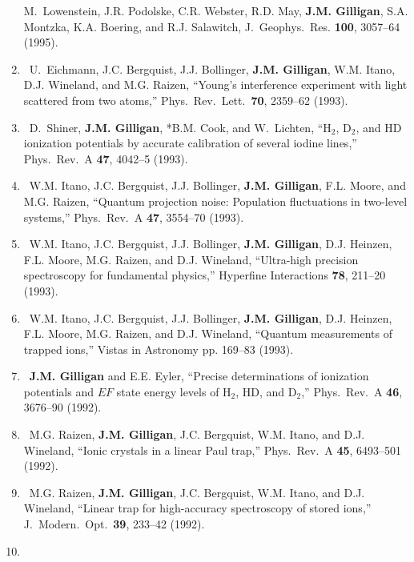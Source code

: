 \begin{enumerate}
    M.~Lowenstein, J.R. Podolske, C.R. Webster, R.D. May, \textbf{J.M. Gilligan}, S.A. Montzka, K.A. Boering, and R.J. Salawitch, 
    J.\ Geophys.\ Res. \textbf{100}, 3057--64 (1995). 
%	
    \item
    \textdagger\ 
    U.~Eichmann, J.C. Bergquist, J.J. Bollinger, \textbf{J.M. Gilligan}, W.M. Itano, D.J. Wineland, and M.G. Raizen, 
    \enquote{Young's interference experiment with light scattered from two atoms,}
    Phys.\ Rev.\ Lett.\ \textbf{70}, 2359--62 (1993). 
%	
    \item
    \textdagger\ 
    D.~Shiner, \textbf{J.M. Gilligan}, *B.M. Cook, and W.~Lichten, 
    \enquote{{H$_2$}, {D$_2$}, and {HD} ionization potentials by accurate calibration of several iodine lines,}  
    Phys.\ Rev.\ A \textbf{47}, 4042--5 (1993). 
%	
    \item
    \textdagger\ 
    W.M. Itano, J.C. Bergquist, J.J. Bollinger, \textbf{J.M. Gilligan}, F.L. Moore, and M.G. Raizen, 
    \enquote{Quantum projection noise: Population fluctuations in two-level systems,}  
    Phys.\ Rev.\ A \textbf{47}, 3554--70 (1993). 
%	
	\item
	\textdagger\ 
	W.M. Itano, J.C. Bergquist, J.J. Bollinger, \textbf{J.M. Gilligan}, D.J. Heinzen, F.L. Moore, M.G. Raizen, and D.J. Wineland, 
    \enquote{Ultra-high precision spectroscopy for fundamental physics,}  
	Hyperfine Interactions \textbf{78}, 211--20 (1993).
%	
	\item
	\textdagger\ 
	W.M. Itano, J.C. Bergquist, J.J. Bollinger, \textbf{J.M. Gilligan}, D.J. Heinzen, F.L. Moore, M.G. Raizen, and D.J. Wineland, 
    \enquote{Quantum measurements of trapped ions,}  
	Vistas in Astronomy pp. 169--83 (1993). 
%	
    \item
    \textdagger\ 
    \textbf{J.M. Gilligan} and E.E. Eyler, 
    \enquote{Precise determinations of ionization potentials and {$EF$} state energy levels of {H$_2$}, {HD}, and {D$_2$},}  
    Phys.\ Rev.\ A \textbf{46}, 3676--90 (1992).
%	
    \item
    \textdagger\ 
    M.G. Raizen, \textbf{J.M. Gilligan}, J.C. Bergquist, W.M. Itano, and D.J. Wineland, 
    \enquote{Ionic crystals in a linear {P}aul trap,}  
    Phys.\ Rev.\ A \textbf{45}, 6493--501 (1992). 
%	
    \item
    \textdagger\ 
    M.G. Raizen, \textbf{J.M. Gilligan}, J.C. Bergquist, W.M. Itano, and D.J. Wineland, 
    \enquote{Linear trap for high-accuracy spectroscopy of stored ions,}  
    J.\ Modern.\ Opt.\ \textbf{39}, 233--42 (1992). 
%	
    \item

\end{enumerate}
